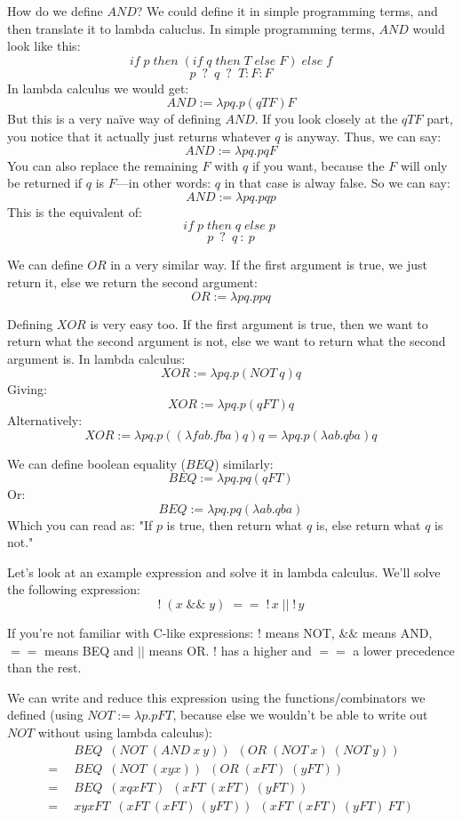 \documentclass[11pt]{article}
\begin{document}
How do we define \(AND\)? We could define it in simple programming terms, and
then translate it to lambda caluclus. In simple programming terms, \(AND\)
would look like this:
\[if\;p\;then\;(if\;q\;then\;T\;else\;F)\;else\;f\]
\[p\enspace ?\enspace q\enspace ?\enspace T:F:F\]
In lambda calculus we would get:
\[AND:=\lambda pq.p(qTF)F\]
But this is a very naïve way of defining \(AND\). If you look closely at the
\(qTF\) part, you notice that it actually just returns whatever \(q\) is
anyway. Thus, we can say:
\[AND:=\lambda pq.pqF\]
You can also replace the remaining \(F\) with \(q\) if you want, because the
\(F\) will only be returned if \(q\) is \(F\)---in other words: \(q\) in that
case is alway false. So we can say:
\[AND:=\lambda pq.pqp\]
This is the equivalent of:
\[if\; p\; then\; q\; else\; p\;\]
\[p\enspace ?\enspace q\::\:p\]

We can define \(OR\) in a very similar way. If the first argument is true, we
just return it, else we return the second argument:
\[OR:=\lambda pq.ppq\]

Defining \(XOR\) is very easy too. If the first argument is true, then we want
to return what the second argument is not, else we want to return what the
second argument is. In lambda calculus:
\[XOR:=\lambda pq.p(NOT\:q)q\]
Giving:
\[XOR:=\lambda pq.p(qFT)q\]
Alternatively:
\[XOR:=\lambda pq.p((\lambda fab.fba)q)q=\lambda pq.p(\lambda ab.qba)q\]

We can define boolean equality (\(BEQ\)) similarly:
\[BEQ:=\lambda pq.pq(qFT)\]
Or:
\[BEQ:=\lambda pq.pq(\lambda ab.qba)\]
Which you can read as: "If \(p\) is true, then return what \(q\) is, else
return what \(q\) is not."

Let's look at an example expression and solve it in lambda calculus. We'll
solve the following expression:
\[!\;(x\;\&\&\;y)\;==\;!\,x\;||\;!\,y\]

If you're not familiar with C-like expressions: \(!\) means NOT, \(\&\&\) means
AND, \(==\) means BEQ and \(||\) means OR. \(!\) has a higher and \(==\) a
lower precedence than the rest.

We can write and reduce this expression using the functions/combinators we
defined (using \(NOT:=\lambda p.pFT\), because else we wouldn't be able to
write out \(NOT\) without using lambda calculus):
\begin{align*}
	&\enspace BEQ\enspace
		(NOT\;(AND\:x\:y))\enspace
		(OR\;(NOT\:x)\;(NOT\:y))\\
	=&\enspace BEQ\enspace
		(NOT\;(xyx))\enspace
		(OR\;(xFT)\;(yFT))\\
	=&\enspace BEQ\enspace
		(xqxFT)\enspace
		(xFT\:(xFT)\:(yFT))\\
	=&\enspace xyxFT\enspace
		(xFT\:(xFT)\:(yFT))\enspace
		(xFT\:(xFT)\:(yFT)\:FT)
\end{align*}
\end{document}

